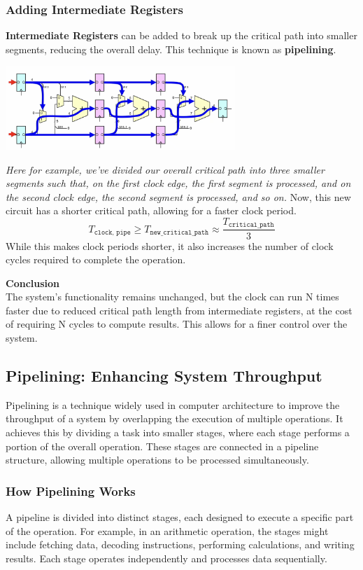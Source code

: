 \subsubsection{Adding Intermediate Registers}
\textbf{Intermediate Registers} can be added to break up the critical path into smaller segments, reducing the overall delay. This technique is known as \textbf{pipelining}.
\begin{center}
    \includegraphics[width=0.65\textwidth]{chapters/chapter4b/images/prop_pipe.png}
\end{center}
\textit{Here for example, we've divided our overall critical path into three smaller segments such that, on the first clock edge, the first segment is processed, and on the second clock edge, the second segment is processed, and so on.}
Now, this new circuit has a shorter critical path, allowing for a faster clock period.
$$T_{\texttt{clock, pipe}} \geq T_{\texttt{new\_critical\_path}} \approx \frac{T_{\texttt{critical\_path}}}{3}$$
While this makes clock periods shorter, it also increases the number of clock cycles required to complete the operation.

\noindent \textbf{Conclusion} \\
The system's functionality remains unchanged, but the clock can run N times faster due to reduced critical path length from intermediate registers, at the cost of requiring N cycles to compute results. This allows for a finer control over the system.

\subsection{Pipelining: Enhancing System Throughput}

Pipelining is a technique widely used in computer architecture to improve the throughput of a system by overlapping the execution of multiple operations. It achieves this by dividing a task into smaller stages, where each stage performs a portion of the overall operation. These stages are connected in a pipeline structure, allowing multiple operations to be processed simultaneously.

\subsubsection*{How Pipelining Works}
A pipeline is divided into distinct stages, each designed to execute a specific part of the operation. For example, in an arithmetic operation, the stages might include fetching data, decoding instructions, performing calculations, and writing results. Each stage operates independently and processes data sequentially.

